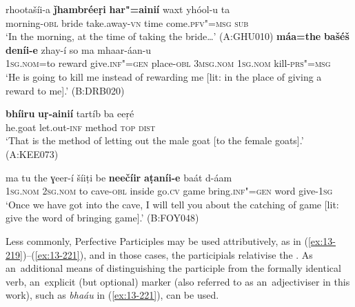 \ea
\label{ex:13-215}
\gll rhootašíi-a \textbf{ǰhambréeṛi} \textbf{har"=ainií} waxt  yhóol-u ta \\
morning-\textsc{obl} bride take.away-\textsc{vn} time come.\textsc{pfv"=msg} \textsc{sub} \\
\glt `In the morning, at the time of taking the bride{\ldots}' (A:GHU010)
\ex
\label{ex:13-216}
\gll \textbf{máa=the} \textbf{bašéš} \textbf{deníi-e} zhay-í so  ma mhaar-áan-u\\
\textsc{1sg.nom}=to reward give.\textsc{inf"=gen} place-\textsc{obl} \textsc{3msg.nom} \textsc{1sg.nom} kill-\textsc{prs"=msg}\\
\glt `He is going to kill me instead of rewarding me [lit: in the place of giving a reward to me].' (B:DRB020)

\ex
\label{ex:13-217}
\gll \textbf{bhíiru} \textbf{uṛ-ainií} tartíb ba eeṛé\\
he.goat let.out-\textsc{inf} method \textsc{top} \textsc{dist} \\
\glt `That is the method of letting out the male goat [to the female goats].' (A:KEE073)

\ex
\label{ex:13-218}
\gll ma tu the ɣeer-í šíiṭi be \textbf{neečíir} \textbf{ aṭaníi-e} baát d-áam \\
\textsc{1sg.nom} \textsc{2sg.nom} to cave-\textsc{obl} inside go.\textsc{cv} game  bring.\textsc{inf"=gen} word give-\textsc{1sg} \\
\glt `Once we have got into the cave, I will tell you about the catching of game [lit: give the word of bringing game].' (B:FOY048) 
\z

Less commonly, Perfective Participles may be used attributively, as in (\ref{ex:13-219})--(\ref{ex:13-221}), and in those cases, the participials relativise the . As an~additional means of distinguishing the participle from the formally identical   verb, an~explicit (but optional)  marker (also referred to as an~adjectiviser in this work), such as \textit{bhaáu} in (\ref{ex:13-221}), can be used.


